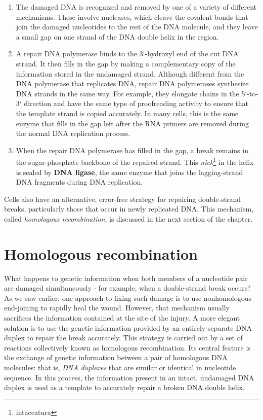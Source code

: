 \begin{enumerate}
\item The damaged DNA is recognized and removed by one of a variety
of different mechanisms. These involve nucleases, which cleave
the covalent bonds that join the damaged nucleotides to the rest of
the DNA molecule, and they leave a small gap on one strand of the
DNA double helix in the region.
\item A repair DNA polymerase binds to the 3`-hydroxyl end of the cut
DNA strand. It then fills in the gap by making a complementary
copy of the information stored in the undamaged strand. Although
different from the DNA polymerase that replicates DNA, repair
DNA polymerases synthesize DNA strands in the same way. For
example, they elongate chains in the 5`-to-3` direction and have
the same type of proofreading activity to ensure that the template
strand is copied accurately. In many cells, this is the same enzyme
that fills in the gap left after the RNA primers are removed during
the normal DNA replication process.
\item When the repair DNA polymerase has filled in the gap, a break
remains in the sugar-phosphate backbone of the repaired strand.
This \textit{nick}\footnote{intaccatura} in the helix is sealed by \textbf{DNA ligase}, the same enzyme that
joins the lagging-strand DNA fragments during DNA replication.
\end{enumerate}

Cells also have an alternative, error-free strategy for repairing double-strand
breaks, particularly those that occur in newly replicated DNA. This
mechanism, called \textit{homologous recombination}, is discussed in the next
section of the chapter.

\section{Homologous recombination}

What happens to genetic information when both members of a
nucleotide pair are damaged simultaneously - for example, when a
double-strand break occurs? As we saw earlier, one approach to fixing
such damage is to use nonhomologous end-joining to rapidly heal the
wound. However, that mechanism usually sacrifices the information
contained at the site of the injury. A more elegant solution is to use the
genetic information provided by an entirely separate DNA duplex to repair
the break accurately. This strategy is carried out by a set of reactions
collectively known as homologous recombination. Its central feature
is the exchange of genetic information between a pair of homologous
DNA molecules: that is, \textit{DNA duplexes} that are similar or identical
in nucleotide sequence. In this process, the information present in an
intact, undamaged DNA duplex is used as a template to accurately repair
a broken DNA double helix.

